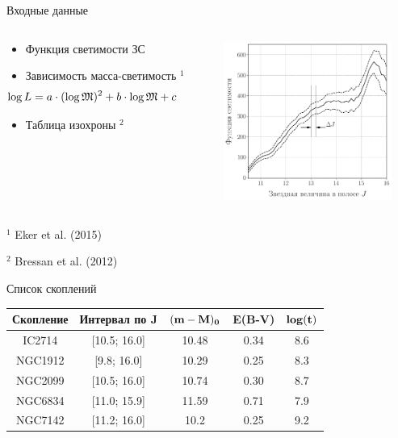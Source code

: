 \documentclass[pdf]{beamer}
\begin{document}
	\begin{frame}{Входные данные}
		\begin{columns}
			\begin{column}{0.6\textwidth}
   				\begin{itemize}
					\item Функция светимости ЗС
					\item<2-> Зависимость масса-светимость $^1$
				\begin{equation*} \hspace{-1.5cm}
				\log L=a \cdot (\log\mathfrak{M})^2+b \cdot \log\mathfrak{M}+c
				\end{equation*}
					\item<3-> Таблица изохроны $^2$
				\end{itemize}
			\end{column}
			
			\begin{column}{0.8\textwidth}
				\hspace{-0.5cm}
				\vspace{-1.9cm}				
    			\includegraphics[width=5.5cm]{images/LF}
			\end{column}
		\end{columns}
		
		\vspace{1cm}
		 {\footnotesize $^1$ Eker et al. (2015)}
		
		 {\footnotesize $^2$ Bressan et al. (2012)}
	\end{frame}
	
	\begin{frame}{Список скоплений}
	\centering
		\begin{tabular}{|c|c|c|c|c|}
			\hline
				\bf{Скопление} & \bf{Интервал по J}& $\bf{(m-M)_0}$ & \bf{E(B-V)} & $\bf{log(t)}$\\
			\hline
			IC2714 & [10.5; 16.0] & 10.48 & 0.34 & 8.6\\
			NGC1912 & [9.8;  16.0] & 10.29 & 0.25 & 8.3\\
			NGC2099 & [10.5;  16.0] & 10.74 & 0.30 & 8.7\\
			NGC6834 & [11.0;  15.9] & 11.59 & 0.71 & 7.9\\
			NGC7142 & [11.2;  16.0] & 10.2 & 0.25 & 9.2\\
			\hline
		\end{tabular}
	\end{frame}
	
\end{document}
